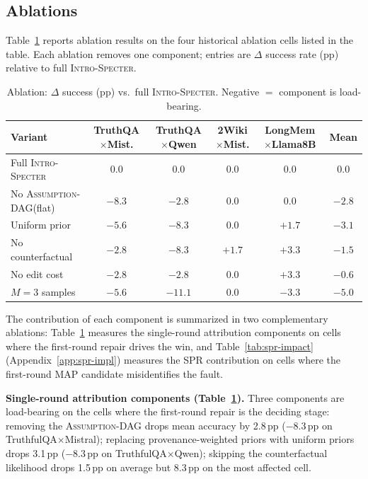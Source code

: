 \documentclass{article}
\newcommand{\method}{\textsc{Intro-Specter}\xspace}
\newcommand{\dagg}{\textsc{Assumption-DAG}\xspace}
\begin{document}
\subsection{Ablations}\label{sec:ablations}

Table~\ref{tab:ablations} reports ablation results on the four historical ablation cells listed in the table. Each ablation removes one component; entries are $\Delta$ success rate (pp) relative to full \method.

\begin{table}[t]\centering\small
\caption{Ablation: $\Delta$ success (pp) vs.\ full \method. Negative $=$ component is load-bearing.}
\label{tab:ablations}\setlength{\tabcolsep}{3pt}
\begin{tabular}{lcccc c}\toprule
Variant & \makecell{TruthQA\\$\times$Mist.} & \makecell{TruthQA\\$\times$Qwen} & \makecell{2Wiki\\$\times$Mist.} & \makecell{LongMem\\$\times$Llama8B} & Mean \\\midrule
Full \method     & 0.0 & 0.0 & 0.0 & 0.0 & 0.0 \\
No \dagg (flat)  & $-8.3$ & $-2.8$ & $0.0$ & $0.0$ & $-2.8$ \\
Uniform prior    & $-5.6$ & $-8.3$ & $0.0$ & $+1.7$ & $-3.1$ \\
No counterfactual & $-2.8$ & $-8.3$ & $+1.7$ & $+3.3$ & $-1.5$ \\
No edit cost     & $-2.8$ & $-2.8$ & $0.0$ & $+3.3$ & $-0.6$ \\
$M{=}3$ samples  & $-5.6$ & $-11.1$ & $0.0$ & $-3.3$ & $-5.0$ \\
\bottomrule\end{tabular}\end{table}

The contribution of each component is summarized in two complementary ablations: Table~\ref{tab:ablations} measures the single-round attribution components on cells where the first-round repair drives the win, and Table~\ref{tab:spr-impact} (Appendix~\ref{app:spr-impl}) measures the SPR contribution on cells where the first-round MAP candidate misidentifies the fault.

\textbf{Single-round attribution components (Table~\ref{tab:ablations}).} Three components are load-bearing on the cells where the first-round repair is the deciding stage: removing the \dagg drops mean accuracy by 2.8\,pp ($-8.3$\,pp on TruthfulQA$\times$Mistral); replacing provenance-weighted priors with uniform priors drops 3.1\,pp ($-8.3$\,pp on TruthfulQA$\times$Qwen); skipping the counterfactual likelihood drops 1.5\,pp on average but 8.3\,pp on the most affected cell.
\end{document}
